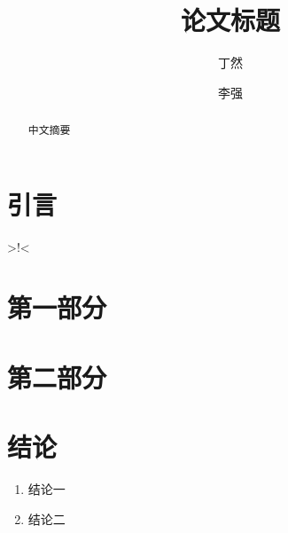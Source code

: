 \documentclass[11pt,a4paper,draft]{article}
\title{论文标题}
\author{丁然 \and 李强}
\date{} %
\begin{document}
\maketitle
\begin{abstract}
  中文摘要
\end{abstract}

\section*{引言}
>!<
\section{第一部分}

\section{第二部分}

\section{结论}
\begin{enumerate}
  \item 结论一
  \item 结论二
\end{enumerate}

\printbibliography[title=参考文献]
\end{document}
